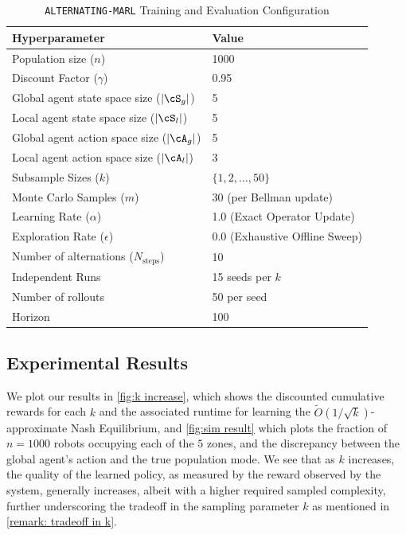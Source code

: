 \documentclass{article}
\theoremstyle{plain}
\theoremstyle{definition}
\begin{document}
\begin{table}[hbt!]
\centering
\begin{tabular}{@{}ll@{}}
\toprule
Hyperparameter & Value \\ \midrule
Population size ($n$) & 1000\\
Discount Factor ($\gamma$) & 0.95 \\
Global agent state space size ($|\cS_g|$) & 5 \\
Local agent state space size ($|\cS_l|$) & 5 \\
Global agent action space size ($|\cA_g|$) & 5 \\
Local agent action space size ($|\cA_l|$) & 3 \\
Subsample Sizes ($k$) & $\{1,2,\dots, 50\}$ \\
Monte Carlo Samples ($m$) & 30 (per Bellman update) \\
Learning Rate ($\alpha$) & 1.0 (Exact Operator Update) \\
Exploration Rate ($\epsilon$) & 0.0 (Exhaustive Offline Sweep) \\
Number of alternations ($N_{\text{steps}}$) & 10 \\
Independent Runs & 15 seeds per $k$ \\

Number of rollouts & 50 per seed \\

Horizon & 100 \\\bottomrule
\end{tabular}
\caption{\texttt{ALTERNATING-MARL} Training and Evaluation Configuration}
\label{tab:hyperparams}
\end{table}


\subsection{Experimental Results}
We plot our results in \cref{fig:k increase}, which shows the discounted cumulative rewards for each $k$ and the associated runtime for learning the $\tilde{O}(1/\sqrt{k})$-approximate Nash Equilibrium, and \cref{fig:sim result} which plots the  fraction of $n=1000$ robots occupying each of the $5$ zones, and the discrepancy between the global agent's action and the true population mode. We see that as $k$ increases, the quality of the learned policy, as measured by the reward observed by the system, generally increases, albeit with a higher required sampled complexity, further underscoring the tradeoff in the sampling parameter $k$ as mentioned in \cref{remark: tradeoff in k}.
\end{document}
